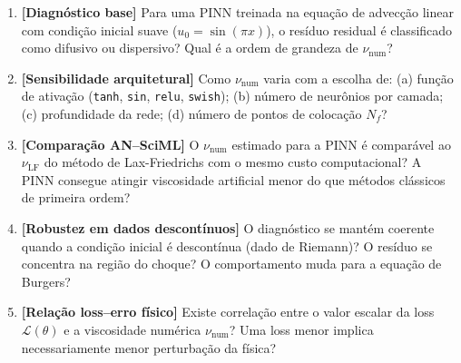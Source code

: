 \documentclass[12pt, a4paper]{article}
\theoremstyle{definition}
\newcommand{\loss}{\mathcal{L}}
\begin{document}
\begin{enumerate}

    \item \textbf{[Diagnóstico base]} Para uma PINN treinada na equação de advecção
    linear com condição inicial suave ($u_0 = \sin(\pi x)$), o resíduo residual
    é classificado como difusivo ou dispersivo? Qual é a ordem de grandeza de
    $\nu_{\mathrm{num}}$?

    \item \textbf{[Sensibilidade arquitetural]} Como $\nu_{\mathrm{num}}$ varia
    com a escolha de: (a) função de ativação (\texttt{tanh}, \texttt{sin},
    \texttt{relu}, \texttt{swish}); (b) número de neurônios por camada;
    (c) profundidade da rede; (d) número de pontos de colocação $N_f$?

    \item \textbf{[Comparação AN--SciML]} O $\nu_{\mathrm{num}}$ estimado para a
    PINN é comparável ao $\nu_{\mathrm{LF}}$ do método de Lax-Friedrichs com o
    mesmo custo computacional? A PINN consegue atingir viscosidade artificial menor
    do que métodos clássicos de primeira ordem?

    \item \textbf{[Robustez em dados descontínuos]} O diagnóstico se mantém coerente
    quando a condição inicial é descontínua (dado de Riemann)? O resíduo se concentra
    na região do choque? O comportamento muda para a equação de Burgers?

    \item \textbf{[Relação loss--erro físico]} Existe correlação entre o valor
    escalar da loss $\loss(\theta)$ e a viscosidade numérica $\nu_{\mathrm{num}}$?
    Uma loss menor implica necessariamente menor perturbação da física?

\end{enumerate}


\newpage
\printbibliography[title={Referências}]
\end{document}
